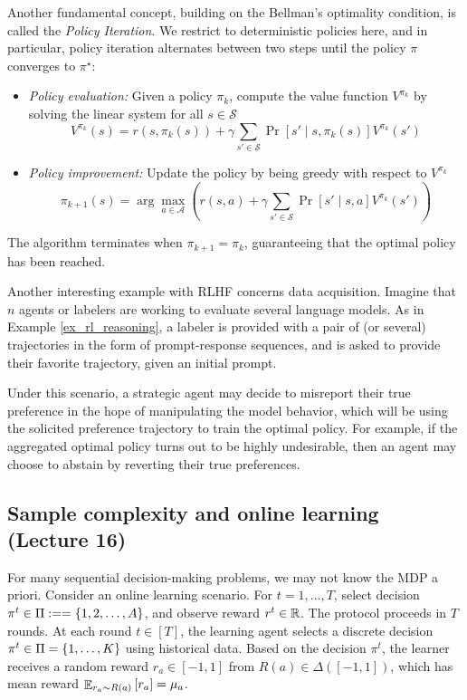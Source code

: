Another fundamental concept, building on the Bellman's optimality condition, is called the \emph{Policy Iteration}.
We restrict to deterministic policies here, and in particular, policy iteration alternates between two steps until the policy $\pi$ converges to $\pi^\star$:
\begin{itemize}
    \item \emph{Policy evaluation:} Given a policy $\pi_k$, compute the value function $V^{\pi_k}$ by solving the linear system for all $s \in \mathcal{S}$
    \[ V^{\pi_k}(s) = r(s, \pi_k(s)) + \gamma \sum_{s' \in \mathcal{S}} \Pr[s' \mid s, \pi_k(s)] V^{\pi_k}(s') \]
    \item \emph{Policy improvement:} Update the policy by being greedy with respect to $V^{\pi_k}$
    \[ \pi_{k+1}(s) = \arg\max_{a \in \mathcal{A}} \left( r(s, a) + \gamma \sum_{s' \in \mathcal{S}} \Pr[s' \mid s, a] V^{\pi_k}(s') \right) \]
\end{itemize}
The algorithm terminates when $\pi_{k+1} = \pi_k$, guaranteeing that the optimal policy has been reached.

\begin{example}
    Another interesting example with RLHF concerns data acquisition.
    Imagine that $n$ agents or labelers are working to evaluate several language models.
    As in Example \ref{ex_rl_reasoning}, a labeler is provided with a pair of (or several) trajectories in the form of prompt-response sequences, and is asked to provide their favorite trajectory, given an initial prompt.

    Under this scenario, a strategic agent may decide to misreport their true preference in the hope of manipulating the model behavior, which will be using the solicited preference trajectory to train the optimal policy.
    For example, if the aggregated optimal policy turns out to be highly undesirable, then an agent may choose to abstain by reverting their true preferences.
\end{example}

\subsection{Sample complexity and online learning (Lecture 16)}

For many sequential decision-making problems, we may not know the MDP a priori.
Consider an online learning scenario.
For $t = 1, \dots, T$, select decision $\pi^t \in \Pi := = \left\{1, 2, \dots, A\right\}$, and observe reward $r^t \in \mathbb{R}$.
The protocol proceeds in $T$ rounds.
At each round $t \in [T]$, the learning agent selects a discrete decision $\pi^t \in \Pi = \left\{1, \dots, K\right\}$ using historical data.
Based on the decision $\pi^t$, the learner receives a random reward $r_a \in [-1, 1]$ from $R(a) \in \Delta([-1, 1])$, which has mean reward
$\mathop{\mathbb{E}}_{r_a \sim R(a)}\left[ r_a \right] = \mu_a$.

